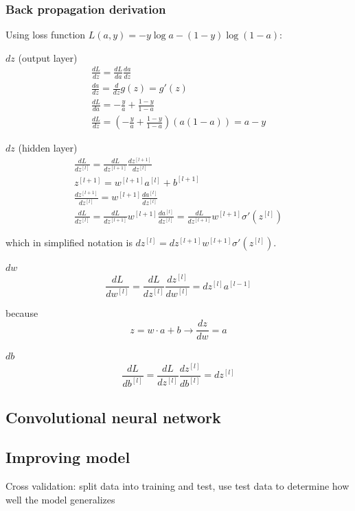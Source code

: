 \documentclass[12pt]{article}
\begin{document}
\subsubsection{Back propagation derivation}

Using loss function $L(a,y) = -y\log a - (1-y)\log (1-a)$:

$dz$ (output layer)
\begin{gather*}
    \frac{dL}{dz} = \frac{dL}{da} \frac{da}{dz}\\
    \frac{da}{dz} = \frac{d}{dz} g(z) = g'(z)\\
    \frac{dL}{da} = -\frac{y}{a} + \frac{1-y}{1-a}\\
    \frac{dL}{dz} = \left(-\frac{y}{a} + \frac{1-y}{1-a}\right)\left(a(1-a)\right) = a - y
\end{gather*}

$dz$ (hidden layer)
\begin{gather*}
    \frac{dL}{dz^{[l]}} = \frac{dL}{dz^{[l+1]}} \frac{dz^{[l+1]}}{dz^{[l]}}\\
    z^{[l+1]} = w^{[l+1]}a^{[l]} + b^{[l+1]}\\
    \frac{dz^{[l+1]}}{dz^{[l]}} = w^{[l+1]}\frac{da^{[l]}}{dz^{[l]}}\\
    \frac{dL}{dz^{[l]}} = \frac{dL}{dz^{[l+1]}} w^{[l+1]} \frac{da^{[l]}}{dz^{[l]}} =
    \frac{dL}{dz^{[l+1]}} w^{[l+1]} \sigma'(z^{[l]})
\end{gather*}

which in simplified notation is $dz^{[l]} = dz^{[l+1]} w^{[l+1]} \sigma'(z^{[l]})$.

$dw$
\[ \frac{dL}{dw^{[l]}} = \frac{dL}{dz^{[l]}} \frac{dz^{[l]}}{dw^{[l]}} = dz^{[l]} a^{[l-1]} \]

because
\[ z = w \cdot a + b \rightarrow \frac{dz}{dw} = a \]

$db$
\[ \frac{dL}{db^{[l]}} = \frac{dL}{dz^{[l]}} \frac{dz^{[l]}}{db^{[l]}} = dz^{[l]} \]

\subsection{Convolutional neural network}


\subsection{Improving model}

Cross validation: split data into training and test, use test data to determine how well the model generalizes
\end{document}
